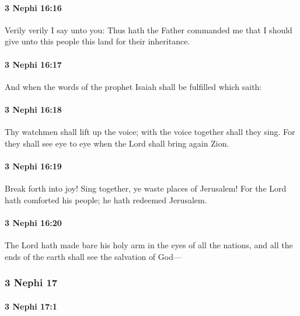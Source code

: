 		\paragraph{3 Nephi 16:16} %
			\label{3NEPHI-16-16}

			Verily verily I say unto you:
			Thus hath the Father commanded me
			that I should give unto this people this land for their inheritance.

		\paragraph{3 Nephi 16:17} %
			\label{3NEPHI-16-17}

			And when the words of the prophet Isaiah shall be fulfilled which saith:

		\paragraph{3 Nephi 16:18} %
			\label{3NEPHI-16-18}

			Thy watchmen shall lift up the voice;
			with the voice together shall they sing.
			For they shall see eye to eye when the Lord shall bring again Zion.

		\paragraph{3 Nephi 16:19} %
			\label{3NEPHI-16-19}

			Break forth into joy!
			Sing together, ye waste places of Jerusalem!
			For the Lord hath comforted his people;
			he hath redeemed Jerusalem.

		\paragraph{3 Nephi 16:20} %
			\label{3NEPHI-16-20}

			The Lord hath made bare his holy arm in the eyes of all the nations,
			and all the ends of the earth shall see the salvation of God---

	\subsubsection{3 Nephi 17} %
		\label{3NEPHI-17}
		
		\paragraph{3 Nephi 17:1} %
			\label{3NEPHI-17-1}

